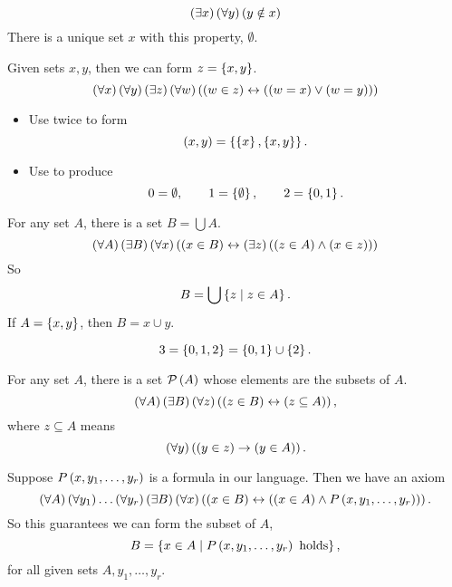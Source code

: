 \begin{axiom}
$$ \teb{x}\fab{y}\nib{y}{x} $$
There is a unique set $ x $ with this property, $ \emptyset $.
\end{axiom}


\begin{axiom}
Given sets $ x, y $, then we can form $ z = \cb{x, y} $.
$$ \fab{x}\fab{y}\teb{z}\fab{w}\iffb{\inb{w}{z}}{\orb{\eqb{w}{x}}{\eqb{w}{y}}} $$
\end{axiom}

\begin{remark2}
\hfill
\begin{itemize}
\item Use twice to form
$$ \rb{x, y} = \cb{\cb{x}, \cb{x, y}}. $$
\item Use to produce
$$ 0 = \emptyset, \qquad 1 = \cb{\emptyset}, \qquad 2 = \cb{0, 1}. $$
\end{itemize}
\end{remark2}

\begin{axiom}
For any set $ A $, there is a set $ B = \bigcup A $.
$$ \fab{A}\teb{B}\fab{x}\iffb{\inb{x}{B}}{\teb{z}\andb{\inb{z}{A}}{\inb{x}{z}}} $$
So
$$ B = \bigcup \cb{z \mid z \in A}. $$
If $ A = \cb{x, y} $, then $ B = x \cup y $.
\end{axiom}

\begin{example2}
$$ 3 = \cb{0, 1, 2} = \cb{0, 1} \cup \cb{2}. $$
\end{example2}

\begin{axiom}
For any set $ A $, there is a set $ \mathcal{P}\rb{A} $ whose elements are the subsets of $ A $.
$$ \fab{A}\teb{B}\fab{z}\iffb{\inb{z}{B}}{\subb{z}{A}}, $$
where $ z \subseteq A $ means
$$ \fab{y}\impb{\inb{y}{z}}{\inb{y}{A}}. $$
\end{axiom}

\pagebreak

\begin{axiom}
Suppose $ P\rb{x, y_1, \dots, y_r} $ is a formula in our language. Then we have an axiom
$$ \fab{A}\fab{y_1} \dots \fab{y_r}\teb{B}\fab{x}\iffb{\inb{x}{B}}{\andb{\inb{x}{A}}{P\rb{x, y_1, \dots, y_r}}}. $$
So this guarantees we can form the subset of $ A $,
$$ B = \cb{x \in A \mid P\rb{x, y_1, \dots, y_r} \ \text{holds}}, $$
for all given sets $ A, y_1, \dots, y_r $.
\end{axiom}

